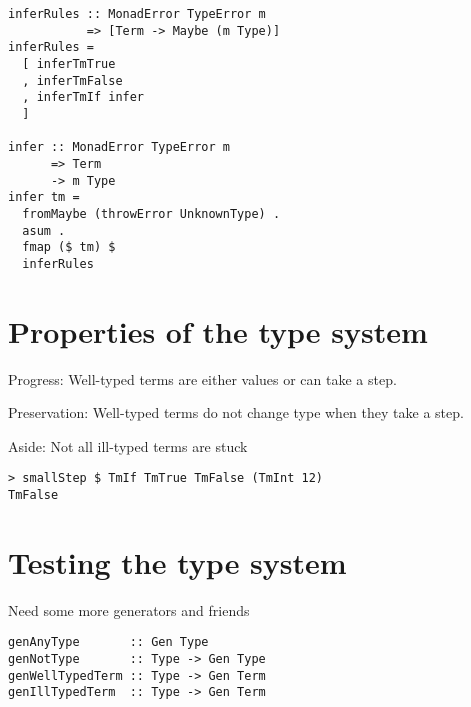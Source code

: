 \documentclass[aspectration=169]{beamer}
\begin{document}
\begin{frame}[fragile]
  \begin{verbatim}
inferRules :: MonadError TypeError m 
           => [Term -> Maybe (m Type)]
inferRules =
  [ inferTmTrue
  , inferTmFalse
  , inferTmIf infer
  ]

infer :: MonadError TypeError m 
      => Term 
      -> m Type
infer tm =
  fromMaybe (throwError UnknownType) .
  asum .
  fmap ($ tm) $
  inferRules
  \end{verbatim}
\end{frame}

\section{Properties of the type system}

\begin{frame}[c]
  \begin{center}
    Progress: Well-typed terms are either values or can take a step.
  \end{center}
\end{frame}

\begin{frame}[c]
  \begin{center}
    Preservation: Well-typed terms do not change type when they take a step.
  \end{center}
\end{frame}

\begin{frame}[fragile,c]
  \begin{center}
    Aside: Not all ill-typed terms are stuck
  \end{center}
  \begin{verbatim}
> smallStep $ TmIf TmTrue TmFalse (TmInt 12)
TmFalse
  \end{verbatim}
\end{frame}

\section{Testing the type system}

\begin{frame}[fragile]
  \begin{center}
  Need some more generators and friends
  \end{center}
  \begin{verbatim}
genAnyType       :: Gen Type
genNotType       :: Type -> Gen Type
genWellTypedTerm :: Type -> Gen Term
genIllTypedTerm  :: Type -> Gen Term
  \end{verbatim}
\end{frame}
\end{document}
